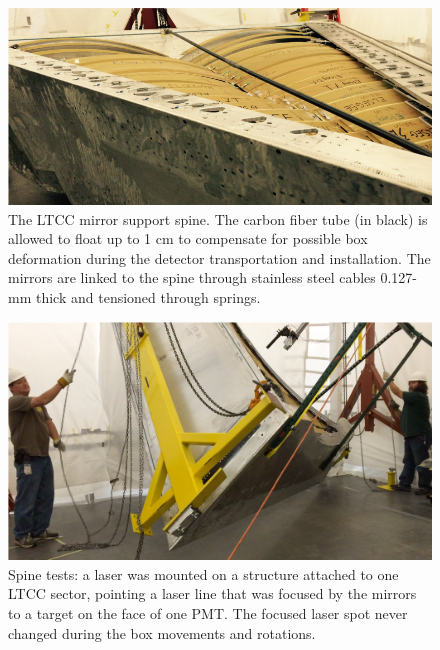 \begin{figure}
	\centering
	\includegraphics[width=1.0\columnwidth,keepaspectratio]{img/spine.png}
	\caption{The LTCC mirror support spine. The carbon fiber tube (in black) is allowed to float up to 1 cm to compensate
             for possible box deformation during the detector transportation and installation. The mirrors are linked to
             the spine through stainless steel cables 0.127-mm thick and tensioned through springs.}
	\label{fig:spine}
\end{figure}


\begin{figure}
	\centering
	\includegraphics[width=1.0\columnwidth,keepaspectratio]{img/spineTest.png}
	\caption{Spine tests: a laser was mounted on a structure attached to one LTCC sector, pointing a laser line that was focused by the mirrors to a
            target on the face of one PMT. The focused laser spot never changed during the box movements and rotations.}
	\label{fig:spineTest}
\end{figure}





